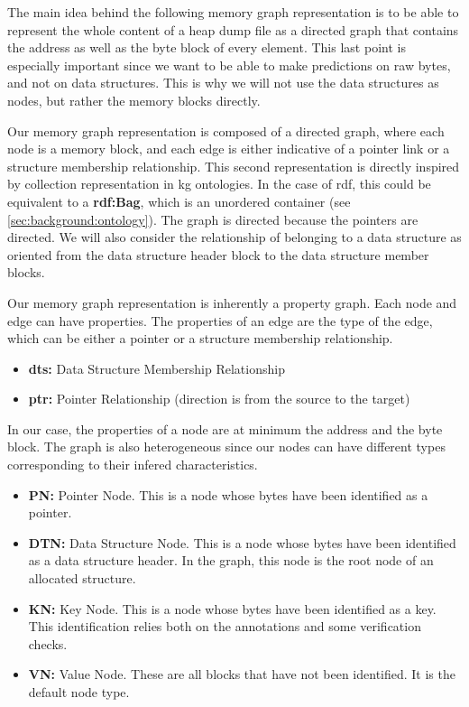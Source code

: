 The main idea behind the following memory graph representation is to be able to represent the whole content of a heap dump file as a directed graph that contains the address as well as the byte block of every element. This last point is especially important since we want to be able to make predictions on raw bytes, and not on data structures. This is why we will not use the data structures as nodes, but rather the memory blocks directly. 

Our memory graph representation is composed of a directed graph, where each node is a memory block, and each edge is either indicative of a pointer link or a structure membership relationship. This second representation is directly inspired by collection representation in \acrlong{kg} ontologies. In the case of \acrshort{rdf}, this could be equivalent to a \textbf{rdf:Bag}, which is an unordered container \cite{OrderedDataInRDF20} (see \ref{sec:background:ontology}). The graph is directed because the pointers are directed. We will also consider the relationship of belonging to a data structure as oriented from the data structure header block to the data structure member blocks.

Our memory graph representation is inherently a property graph. Each node and edge can have properties. The properties of an edge are the type of the edge, which can be either a pointer or a structure membership relationship.

\begin{itemize}
    \item \textbf{dts:} Data Structure Membership Relationship
    \item \textbf{ptr:} Pointer Relationship (direction is from the source to the target)
\end{itemize}

In our case, the properties of a node are at minimum the address and the byte block.  The graph is also heterogeneous since our nodes can have different types corresponding to their infered characteristics. 

\begin{itemize}
    \item \textbf{PN:} Pointer Node. This is a node whose bytes have been identified as a pointer.
    \item \textbf{DTN:} Data Structure Node. This is a node whose bytes have been identified as a data structure header. In the graph, this node is the root node of an allocated structure.
    \item \textbf{KN:} Key Node. This is a node whose bytes have been identified as a key. This identification relies both on the annotations and some verification checks.
    \item \textbf{VN:} Value Node. These are all blocks that have not been identified. It is the default  node type.
\end{itemize}

